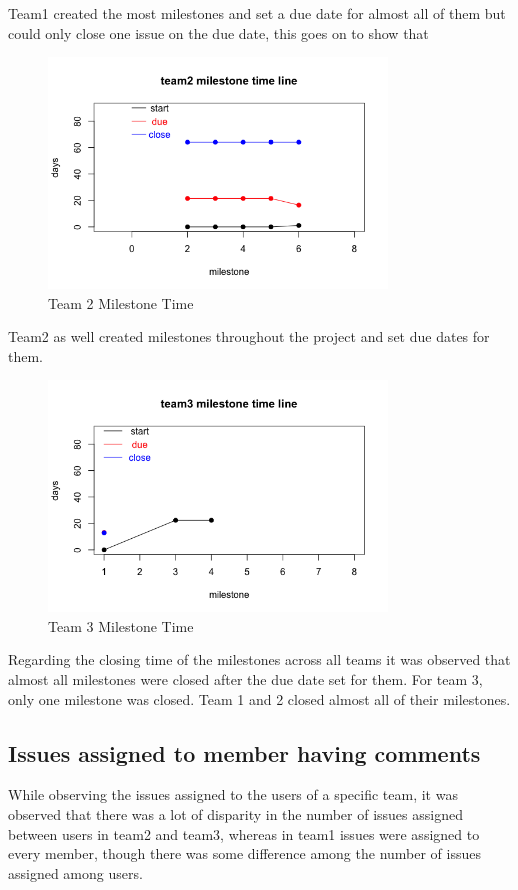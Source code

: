 \documentclass[conference]{IEEEtran}
\begin{document}
Team1 created the most milestones and set a due date for almost all of them but could only close one issue on the due date, this goes on to show that 


\begin{figure}[H]
    \centering
    \includegraphics[width=9cm]{../AprilProject/pic/team2_milestone_time.png}
    \caption{Team 2 Milestone Time}
    \label{team2_milestone_time}
\end{figure}

Team2 as well created milestones throughout the project and set due dates for them.




\begin{figure}[H]
    \centering
    \includegraphics[width=9cm]{../AprilProject/pic/team3_milestone_time.png}
    \caption{Team 3 Milestone Time}
    \label{team3_milestone_time}
\end{figure}

Regarding the closing time of the milestones across all teams it was observed that almost all milestones were closed after the due date set for them. For team 3, only one milestone was closed. Team 1 and 2 closed almost all of their milestones.

\subsection{Issues assigned to member having comments}
While observing the issues assigned to the users of a specific team, it was observed that there was a lot of disparity in the number of issues assigned between users in team2 and team3, whereas in team1 issues were assigned to every member, though there was some difference among the number of issues assigned among users.
\end{document}
